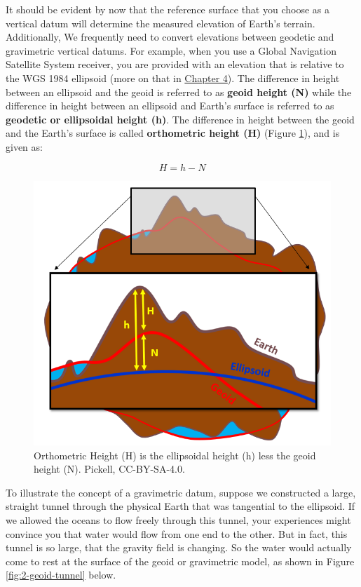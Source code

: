 \documentclass[
]{book}
\begin{document}
It should be evident by now that the reference surface that you choose as a vertical datum will determine the measured elevation of Earth's terrain. Additionally, We frequently need to convert elevations between geodetic and gravimetric vertical datums. For example, when you use a Global Navigation Satellite System receiver, you are provided with an elevation that is relative to the WGS 1984 ellipsoid (more on that in \href{https://ubc-geomatics-textbook.github.io/geomatics-textbook/collecting-and-editing-data.html}{Chapter 4}). The difference in height between an ellipsoid and the geoid is referred to as \textbf{geoid height (N)} while the difference in height between an ellipsoid and Earth's surface is referred to as \textbf{geodetic or ellipsoidal height (h)}. The difference in height between the geoid and the Earth's surface is called \textbf{orthometric height (H)} (Figure \ref{fig:2-H-h-N}), and is given as:

\[
H = h - N
\]

\begin{figure}
\includegraphics[width=0.75\linewidth]{images/02-H-h-N} \caption{Orthometric Height (H) is the ellipsoidal height (h) less the geoid height (N). Pickell, CC-BY-SA-4.0.}\label{fig:2-H-h-N}
\end{figure}

To illustrate the concept of a gravimetric datum, suppose we constructed a large, straight tunnel through the physical Earth that was tangential to the ellipsoid. If we allowed the oceans to flow freely through this tunnel, your experiences might convince you that water would flow from one end to the other. But in fact, this tunnel is so large, that the gravity field is changing. So the water would actually come to rest at the surface of the geoid or gravimetric model, as shown in Figure \ref{fig:2-geoid-tunnel} below.
\end{document}
